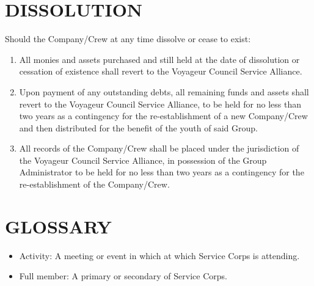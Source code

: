 \documentclass{Service_Corps_Document}
\begin{document}
    \section{DISSOLUTION}
    Should the Company/Crew at any time dissolve or cease to exist:
    \begin{enumerate}
        \item All monies and assets purchased and still held at the date of dissolution or cessation of existence shall revert to the Voyageur Council Service Alliance.
        \item Upon payment of any outstanding debts, all remaining funds and assets shall revert to the Voyageur Council Service Alliance, to be held for no less than two years as a contingency for the re-establishment of a new Company/Crew and then distributed for the benefit of the youth of said Group.
        \item All records of the Company/Crew shall be placed under the jurisdiction of the Voyageur Council Service Alliance, in possession of the Group Administrator to be held for no less than two years as a contingency for the re-establishment of the Company/Crew.
    \end{enumerate}


    \section{GLOSSARY}
    \begin{itemize}
        \item Activity: A meeting or event in which at which Service Corps is attending.
        \item Full member: A primary or secondary of Service Corps.
    \end{itemize}
\end{document}
